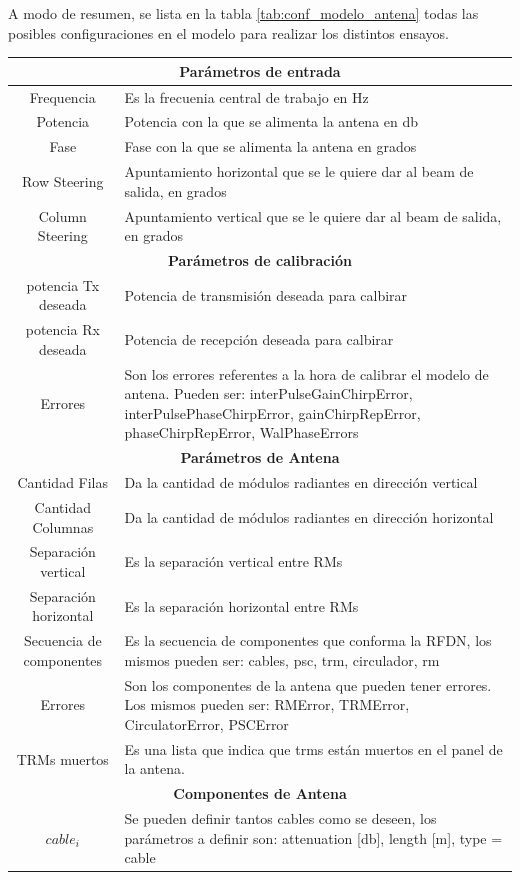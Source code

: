 A modo de resumen, se lista en la tabla \ref{tab:conf_modelo_antena} todas las posibles configuraciones en el modelo para 
realizar los distintos ensayos.

\begin{center}
  \footnotesize
  \centering
  \begin{longtable}{|c|p{9cm}|}
    \hline 
	\multicolumn{2}{|c|}{\textbf{Parámetros de entrada}} \\ 
	\hline
    Frequencia		& Es la frecuenia central de trabajo en Hz \tabularnewline \hline 
    Potencia		& Potencia con la que se alimenta la antena en db \tabularnewline \hline 
    Fase			& Fase con la que se alimenta la antena en grados \tabularnewline \hline 
    Row Steering	& Apuntamiento horizontal que se le quiere dar al beam de salida, en grados  \tabularnewline \hline 
    Column Steering	& Apuntamiento vertical que se le quiere dar al beam de salida, en grados  \tabularnewline \hline 
	\multicolumn{2}{|c|}{\textbf{Parámetros de calibración}} \\ 
	\hline
	potencia Tx deseada	& Potencia de transmisión deseada para calbirar  \tabularnewline \hline 
	potencia Rx deseada	& Potencia de recepción deseada para calbirar  \tabularnewline \hline 
	Errores	& Son los errores referentes a la hora de calibrar el modelo de antena. Pueden ser: interPulseGainChirpError, interPulsePhaseChirpError, gainChirpRepError, phaseChirpRepError, WalPhaseErrors  \tabularnewline \hline
	\multicolumn{2}{|c|}{\textbf{Parámetros de Antena}} \\ 
	\hline
	Cantidad Filas	& Da la cantidad de módulos radiantes en dirección vertical \tabularnewline \hline 
	Cantidad Columnas	& Da la cantidad de módulos radiantes en dirección horizontal \tabularnewline \hline 
	Separación vertical & Es la separación vertical entre RMs \tabularnewline \hline 
	Separación horizontal & Es la separación horizontal entre RMs \tabularnewline \hline 
	Secuencia de componentes & Es la secuencia de componentes que conforma la RFDN, los mismos pueden ser: cables, psc, trm, circulador, rm \tabularnewline \hline 
	Errores  & Son los componentes de la antena que pueden tener errores. Los mismos pueden ser: RMError, TRMError, CirculatorError, PSCError \tabularnewline \hline 
	TRMs muertos & Es una lista que indica que trms están muertos en el panel de la antena. \tabularnewline \hline 
	\multicolumn{2}{|c|}{\textbf{Componentes de Antena}} \\
	\hline
	$cable_i$ & Se pueden definir tantos cables como se deseen, los parámetros a definir son: attenuation [db], length [m], type = cable \tabularnewline \hline 

\end{longtable}
\end{center}
